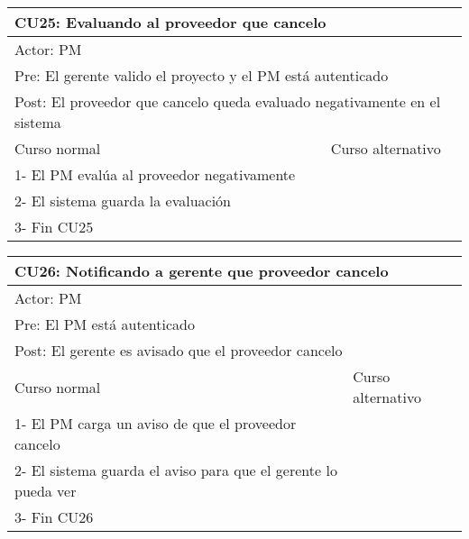 \begin{table}[H]
  \begin{adjustbox}{max width = \textwidth}
  \begin{tabular}{|l|l|}
    \hline
    \multicolumn{2}{|l|}{CU25: Evaluando al proveedor que cancelo} \\\hline
    \multicolumn{2}{|l|}{Actor: PM} \\\hline
    \multicolumn{2}{|l|}{Pre: El gerente valido el proyecto y el PM está autenticado} \\\hline
    \multicolumn{2}{|l|}{Post: El proveedor que cancelo queda evaluado negativamente en el sistema} \\\hline
     Curso normal & Curso alternativo\\ \hline
     1- El PM evalúa al proveedor negativamente & \\ \hline
  	 2- El sistema guarda la evaluación & \\ \hline
     3- Fin CU25 & \\ \hline
 \end{tabular}
  \end{adjustbox}
\end{table}

\begin{table}[H]
  \begin{adjustbox}{max width = \textwidth}
  \begin{tabular}{|l|l|}
    \hline
    \multicolumn{2}{|l|}{CU26: Notificando a gerente que proveedor cancelo} \\\hline
    \multicolumn{2}{|l|}{Actor: PM} \\\hline
    \multicolumn{2}{|l|}{Pre: El PM está autenticado} \\\hline
    \multicolumn{2}{|l|}{Post: El gerente es avisado que el proveedor cancelo} \\\hline
     Curso normal & Curso alternativo\\ \hline
     1- El PM carga un aviso de que el proveedor cancelo & \\ \hline
  	 2- El sistema guarda el aviso para que el gerente lo pueda ver & \\ \hline
     3- Fin CU26 & \\ \hline
 \end{tabular}
  \end{adjustbox}
\end{table}


